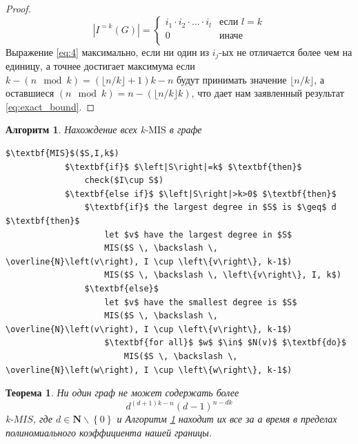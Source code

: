 \documentclass[12pt]{article}
\newtheorem{theorem}{Теорема}
\newtheorem{algorithm}{Алгоритм}
\begin{document}
\begin{proof}
	\begin{equation}\label{eq:4}
	    \left| I^{=k}\left(G\right) \right| = \begin{cases}
	        i_1 \cdot i_2 \cdot \dotsc \cdot i_l & \text{если } l = k
	        \\
	        0 & \text{иначе}
	        \\
	    \end{cases}
	\end{equation}
	Выражение \eqref{eq:4} максимально, если ни один из $i_j$-ых не отличается более чем на единицу, а точнее достигает максимума если $k - \left(n \mod k\right) = \left(\lfloor n / k \rfloor + 1\right)k - n$ будут принимать значение $\lfloor n / k \rfloor$, а оставшиеся $\left(n \mod k\right) = n - \left(\lfloor n/k \rfloor k\right)$, что дает нам заявленный результат \eqref{eq:exact_bound}.
\end{proof}
\begin{algorithm}\label{alg:MIS}
Нахождение всех k-$\text{MIS}$ в графе
    \lstset{basicstyle=\normalfont,breaklines=true}
    \begin{lstlisting}[mathescape=true]
        $\textbf{MIS}$($S,I,k$)
            $\textbf{if}$ $\left|S\right|=k$ $\textbf{then}$
                check($I\cup S$)
            $\textbf{else if}$ $\left|S\right|>k>0$ $\textbf{then}$
            	$\textbf{if}$ the largest degree in $S$ is $\geq$ d $\textbf{then}$
            	    let $v$ have the largest degree in $S$
            	    MIS($S \, \backslash \, \overline{N}\left(v\right), I \cup \left\{v\right\}, k-1$)
            	    MIS($S \, \backslash \, \left\{v\right\}, I, k$)
            	$\textbf{else}$
            	    let $v$ have the smallest degree is $S$
            	    MIS($S \, \backslash \, \overline{N}\left(v\right), I \cup \left\{v\right\}, k-1$)
            	    $\textbf{for all}$ $w$ $\in$ $N(v)$ $\textbf{do}$
            	        MIS($S \, \backslash \, \overline{N}\left(w\right), I \cup \left\{w\right\}, k-1$)
    \end{lstlisting}
\end{algorithm}
\begin{theorem}
Ни один граф не может содержать более
\begin{equation}\label{eq:d_bound}
    d^{\left(d+1\right)k - n}\left(d-1\right)^{n - dk}
\end{equation}
k-$MIS$, где $d \in \mathbf{N}\backslash\left\{0\right\}$ и Алгоритм \ref{alg:MIS} находит их все за а время в пределах по\-ли\-но\-ми\-аль\-но\-го коэффициента нашей границы.
\end{theorem}
\end{document}
